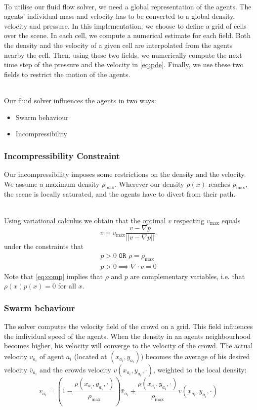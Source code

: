 \documentclass{article}
\begin{document}
\ \\
To utilise our fluid flow solver, we need a global representation of the agents. The agents' individual mass and velocity has to be converted to a global density, velocity and pressure. In this implementation, we choose to define a grid of cells over the scene. In each cell, we compute a numerical estimate for each field. Both the density and the velocity of a given cell are interpolated from the agents nearby the cell. Then, using these two fields, we numerically compute the next time step of the pressure and the velocity in \eqref{eq:pde}. Finally, we use these two fields to restrict the motion of the agents.

\ \\
Our fluid solver influences the agents in two ways: 
\begin{itemize}
\item Swarm behaviour
\item Incompressibility
\end{itemize}
\subsubsection{Incompressibility Constraint}
Our incompressibility imposes some restrictions on the density and the velocity. We assume a maximum density $\rho_{\max}$. Wherever our density $\rho(x)$ reaches $\rho_{\max}$, the scene is locally saturated, and the agents have to divert from their path. 

\ \\
\underline{Using variational calculus} we obtain that the optimal $v$ respecting $v_{\max}$ equals $$v = v_{\max}\frac{v-\nabla p}{||v-\nabla p||}.$$
under the constraints that 
\begin{align}
\label{eq:comp}
p>0 \texttt{ OR } \rho=\rho_{\max}\\
p>0 \implies \nabla\cdot v=0
\end{align}
Note that \eqref{eq:comp} implies that $\rho$ and $p$ are complementary variables, i.e. that $\rho(x)p(x)=0$ for all $x$.
\subsubsection{Swarm behaviour}
The solver computes the velocity field of the crowd on a grid. This field influences the individual speed of the agents. When the density in an agents neighbourhood becomes higher, his velocity will converge to the velocity of the crowd. The actual velocity $v_{a_i}$ of agent $a_i$ (located at $(x_{a_i},y_{a_i})$) becomes the average of his desired velocity $\bar{v}_{a_i}$ and the crowds velocity $v(x_{a_i},y_{a_i},\cdot)$, weighted to the local density:
\begin{equation}
	v_{a_i} = \left(1-\frac{\rho(x_{a_i},y_{a_i},\cdot)}{\rho_{\max}}\right)\bar{v}_{a_i}+\frac{\rho(x_{a_i},y_{a_i},\cdot)}{\rho_{\max}}v(x_{a_i},y_{a_i},\cdot)
	\label{eq:dens_velo}
\end{equation}
\end{document}
